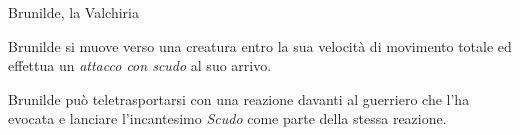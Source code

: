 \begin{DndMonster}[float*=b,width=\textwidth + 8pt]{Brunilde, la Valchiria}
\begin{multicols}{2}
      
      Brunilde si muove verso una creatura entro la sua velocità di movimento totale ed effettua un \textit{attacco con scudo} al suo arrivo.

  
      Brunilde può teletrasportarsi con una reazione davanti al guerriero che l'ha evocata e lanciare l'incantesimo \textit{Scudo} come parte della stessa reazione.

  
    \end{multicols}
  \end{DndMonster}